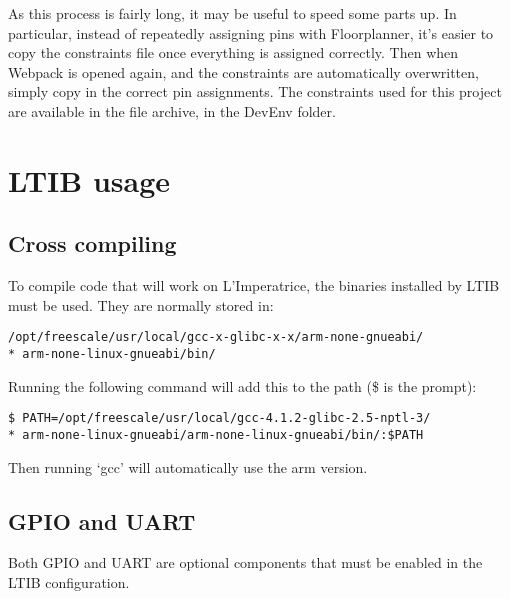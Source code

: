 	As this process is fairly long, it may be useful to speed some parts up.  In particular, instead of repeatedly assigning pins with Floorplanner, it's easier to copy the constraints file once everything is assigned correctly.  Then when Webpack is opened again, and the constraints are automatically overwritten, simply copy in the correct pin assignments.  The constraints used for this project are available in the file archive, in the DevEnv folder.



\section{LTIB usage} %
\label{apdx:ltib_usage}

	\subsection{Cross compiling} %
	\label{apdx:cross_compiling}
		To compile code that will work on L'Imperatrice, the binaries installed by LTIB must be used.  They are normally stored in:

		\texttt{/opt/freescale/usr/local/gcc-x-glibc-x-x/arm-none-gnueabi/\\*
		arm-none-linux-gnueabi/bin/}
		  
		Running the following command will add this to the path (\$ is the prompt):

		\texttt{\$ PATH=/opt/freescale/usr/local/gcc-4.1.2-glibc-2.5-nptl-3/\\*
		arm-none-linux-gnueabi/arm-none-linux-gnueabi/bin/:\$PATH}

		Then running `gcc' will automatically use the arm version.


	\subsection{GPIO and UART} %
	\label{apdx:gpio_and_uart}
		Both GPIO and UART are optional components that must be enabled in the LTIB configuration.  



